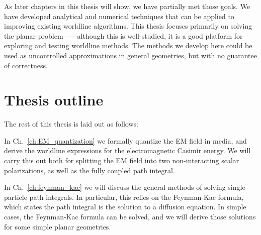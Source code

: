 As later chapters in this thesis will show, we have partially met those goals.  We have developed analytical
and numerical techniques that can be applied to improving existing worldline algorithms.
This thesis focuses primarily on solving the planar problem ---- although this is well-studied,
it is a good platform for exploring and testing worldline methods.  
The methods we develop here could be used as uncontrolled approximations in general geometries, but with
no guarantee of correctness.  

\section{Thesis outline}

The rest of this thesis is laid out as follows: 

In Ch.~\ref{ch:EM_quantization} we formally quantize
the EM field in media, and derive the worldline expressions for the electromagnetic Casimir energy.
We will carry this out both for splitting the EM field into two non-interacting scalar polarizations,
as well as the fully coupled path integral.

In Ch.~\ref{ch:feynman_kac} we will discuss the general methods of solving single-particle path 
integrals.  In particular, this relies on the Feynman-Kac formula, which states the path integral
 is the solution to a diffusion equation.  In simple cases, the Feynman-Kac formula can be solved,
and we will derive those solutions for some simple planar geometries. 

